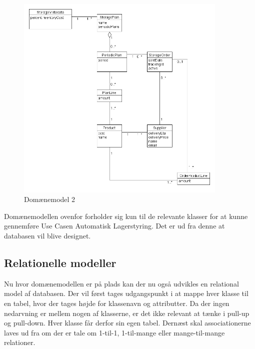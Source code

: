 \begin{figure}[H]
    \centering
    \includegraphics[width=0.9\textwidth]{figures/krav/domain_model_2.png}
    \caption{Domænemodel 2}
    \label{fig:domain_model_2}
\end{figure}

Domænemodellen ovenfor forholder sig kun til de relevante klasser for at kunne gennemføre Use Casen Automatisk Lagerstyring. Det er ud fra denne at databasen vil blive designet.

\subsection{Relationelle modeller}
Nu hvor domænemodellen er på plads kan der nu også udvikles en relational model af databasen. Der vil først tages udgangspunkt i at mappe hver klasse til en tabel, hvor der tages højde for klassenavn og attributter.
Da der ingen nedarvning er mellem nogen af klasserne, er det ikke relevant at tænke i pull-up og pull-down. Hver klasse får derfor sin egen tabel.
Dernæst skal associationerne laves ud fra om der er tale om 1-til-1, 1-til-mange eller mange-til-mange relationer. 

